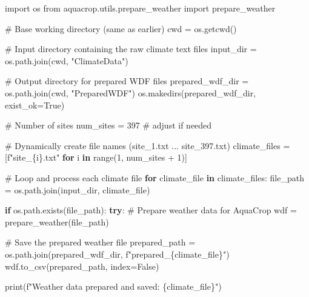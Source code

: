 \documentclass[
  letterpaper,
  DIV=11,
  numbers=noendperiod]{scrartcl}
\newenvironment{Shaded}{\begin{snugshade}}{\end{snugshade}}
\newcommand{\BuiltInTok}[1]{\textcolor[rgb]{0.00,0.23,0.31}{#1}}
\newcommand{\CommentTok}[1]{\textcolor[rgb]{0.37,0.37,0.37}{#1}}
\newcommand{\ControlFlowTok}[1]{\textcolor[rgb]{0.00,0.23,0.31}{\textbf{#1}}}
\newcommand{\DecValTok}[1]{\textcolor[rgb]{0.68,0.00,0.00}{#1}}
\newcommand{\ImportTok}[1]{\textcolor[rgb]{0.00,0.46,0.62}{#1}}
\newcommand{\KeywordTok}[1]{\textcolor[rgb]{0.00,0.23,0.31}{\textbf{#1}}}
\newcommand{\NormalTok}[1]{\textcolor[rgb]{0.00,0.23,0.31}{#1}}
\newcommand{\OperatorTok}[1]{\textcolor[rgb]{0.37,0.37,0.37}{#1}}
\newcommand{\SpecialCharTok}[1]{\textcolor[rgb]{0.37,0.37,0.37}{#1}}
\newcommand{\SpecialStringTok}[1]{\textcolor[rgb]{0.13,0.47,0.30}{#1}}
\newcommand{\StringTok}[1]{\textcolor[rgb]{0.13,0.47,0.30}{#1}}
\newcommand{\VariableTok}[1]{\textcolor[rgb]{0.07,0.07,0.07}{#1}}
\begin{document}
\begin{Shaded}
\begin{Highlighting}[]
\ImportTok{import}\NormalTok{ os}
\ImportTok{from}\NormalTok{ aquacrop.utils.prepare\_weather }\ImportTok{import}\NormalTok{ prepare\_weather}

\CommentTok{\# Base working directory (same as earlier)}
\NormalTok{cwd }\OperatorTok{=}\NormalTok{ os.getcwd()}

\CommentTok{\# Input directory containing the raw climate text files}
\NormalTok{input\_dir }\OperatorTok{=}\NormalTok{ os.path.join(cwd, }\StringTok{"ClimateData"}\NormalTok{)}

\CommentTok{\# Output directory for prepared WDF files}
\NormalTok{prepared\_wdf\_dir }\OperatorTok{=}\NormalTok{ os.path.join(cwd, }\StringTok{"PreparedWDF"}\NormalTok{)}
\NormalTok{os.makedirs(prepared\_wdf\_dir, exist\_ok}\OperatorTok{=}\VariableTok{True}\NormalTok{)}

\CommentTok{\# Number of sites}
\NormalTok{num\_sites }\OperatorTok{=} \DecValTok{397}  \CommentTok{\# adjust if needed}

\CommentTok{\# Dynamically create file names (site\_1.txt ... site\_397.txt)}
\NormalTok{climate\_files }\OperatorTok{=}\NormalTok{ [}\SpecialStringTok{f"site\_}\SpecialCharTok{\{}\NormalTok{i}\SpecialCharTok{\}}\SpecialStringTok{.txt"} \ControlFlowTok{for}\NormalTok{ i }\KeywordTok{in} \BuiltInTok{range}\NormalTok{(}\DecValTok{1}\NormalTok{, num\_sites }\OperatorTok{+} \DecValTok{1}\NormalTok{)]}

\CommentTok{\# Loop and process each climate file}
\ControlFlowTok{for}\NormalTok{ climate\_file }\KeywordTok{in}\NormalTok{ climate\_files:}
\NormalTok{    file\_path }\OperatorTok{=}\NormalTok{ os.path.join(input\_dir, climate\_file)}

    \ControlFlowTok{if}\NormalTok{ os.path.exists(file\_path):}
        \ControlFlowTok{try}\NormalTok{:}
            \CommentTok{\# Prepare weather data for AquaCrop}
\NormalTok{            wdf }\OperatorTok{=}\NormalTok{ prepare\_weather(file\_path)}

            \CommentTok{\# Save the prepared weather file}
\NormalTok{            prepared\_path }\OperatorTok{=}\NormalTok{ os.path.join(prepared\_wdf\_dir, }\SpecialStringTok{f"prepared\_}\SpecialCharTok{\{}\NormalTok{climate\_file}\SpecialCharTok{\}}\SpecialStringTok{"}\NormalTok{)}
\NormalTok{            wdf.to\_csv(prepared\_path, index}\OperatorTok{=}\VariableTok{False}\NormalTok{)}

            \BuiltInTok{print}\NormalTok{(}\SpecialStringTok{f"Weather data prepared and saved: }\SpecialCharTok{\{}\NormalTok{climate\_file}\SpecialCharTok{\}}\SpecialStringTok{"}\NormalTok{)}


\end{Highlighting}
\end{Shaded}
\end{document}
